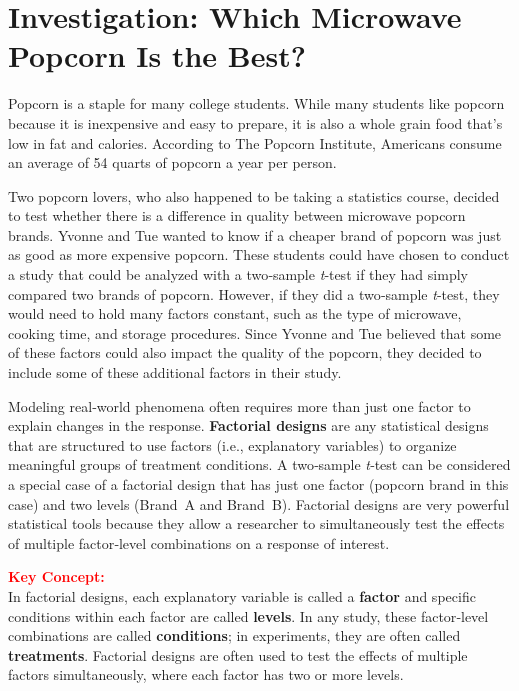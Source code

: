 \documentclass[
]{report}
\begin{document}
\section{\texorpdfstring{\textbf{Investigation: Which Microwave Popcorn Is the Best?}}{Investigation: Which Microwave Popcorn Is the Best?}}\label{investigation-which-microwave-popcorn-is-the-best}

Popcorn is a staple for many college students. While many students like popcorn because it is inexpensive and easy to prepare, it is also a whole grain food that's low in fat and calories. According to The Popcorn Institute, Americans consume an average of 54 quarts of popcorn a year per person.

Two popcorn lovers, who also happened to be taking a statistics course, decided to test whether there is a difference in quality between microwave popcorn brands. Yvonne and Tue wanted to know if a cheaper brand of popcorn was just as good as more expensive popcorn. These students could have chosen to conduct a study that could be analyzed with a two‑sample \emph{t}‑test if they had simply compared two brands of popcorn. However, if they did a two‑sample \emph{t}‑test, they would need to hold many factors constant, such as the type of microwave, cooking time, and storage procedures. Since Yvonne and Tue believed that some of these factors could also impact the quality of the popcorn, they decided to include some of these additional factors in their study.

Modeling real‑world phenomena often requires more than just one factor to explain changes in the response. \textbf{Factorial designs} are any statistical designs that are structured to use factors (i.e., explanatory variables) to organize meaningful groups of treatment conditions. A two‑sample \emph{t}‑test can be considered a special case of a factorial design that has just one factor (popcorn brand in this case) and two levels (Brand~A and Brand~B). Factorial designs are very powerful statistical tools because they allow a researcher to simultaneously test the effects of multiple factor‑level combinations on a response of interest.

\large

\textbf{\textcolor{red}{Key Concept:}}\\
\color{red}
In factorial designs, each explanatory variable is called a \textbf{factor} and specific conditions within each factor are called \textbf{levels}. In any study, these factor‑level combinations are called \textbf{conditions}; in experiments, they are often called \textbf{treatments}. Factorial designs are often used to test the effects of multiple factors simultaneously, where each factor has two or more levels.\\
\color{black}
\normalsize
\end{document}
